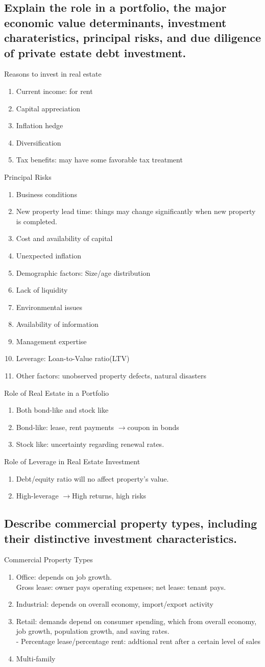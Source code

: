 \documentclass{article}
\newcommand{\be}{\begin{enumerate}}
\newcommand{\ee}{\end{enumerate}}
\newcommand{\ra}{$\rightarrow$}
\begin{document}
\subsection{Explain the role in a portfolio, the major economic value determinants, 
investment charateristics, principal risks, and due diligence of private estate debt investment.}
Reasons to invest in real estate
\be
    \item Current income: for rent
    \item Capital appreciation
    \item Inflation hedge
    \item Diversification
    \item Tax benefits: may have some favorable tax treatment
\ee
Principal Risks
\be
    \item Business conditions
    \item New property lead time: things may change significantly when new property
    is completed.
    \item Cost and availability of capital
    \item Unexpected inflation
    \item Demographic factors: Size/age distribution
    \item Lack of liquidity
    \item Environmental issues
    \item Availability of information
    \item Management expertise
    \item Leverage: Loan-to-Value ratio(LTV)
    \item Other factors: unobserved property defects, natural disasters
\ee
Role of Real Estate in a Portfolio
\be
    \item Both bond-like and stock like
    \item Bond-like: lease, rent payments \ra coupon in bonds
    \item Stock like: uncertainty regarding renewal rates.
\ee
Role of Leverage in Real Estate Investment
\be
    \item Debt/equity ratio will no affect property's value.
    \item High-leverage \ra High returns, high risks
\ee
\subsection{Describe commercial property types, including their distinctive investment
characteristics.}
Commercial Property Types
\be
    \item Office: depends on job growth.
    \\Gross lease: owner pays operating expenses; net lease: tenant pays.
    \item Industrial: depends on overall economy, import/export activity
    \item Retail: demands depend on consumer spending, which from overall economy, 
    job growth, population growth, and saving rates.
    \\ - Percentage lease/percentage rent: addtional rent after a certain level of sales
    \item Multi-family
\ee
\end{document}
